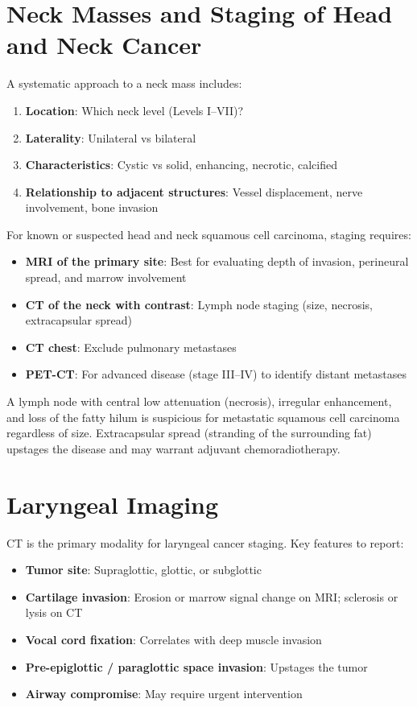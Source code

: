 \section{Neck Masses and Staging of Head and Neck Cancer}
A systematic approach to a neck mass includes:

\begin{enumerate}
  \item \textbf{Location}: Which neck level (Levels I--VII)?
  \item \textbf{Laterality}: Unilateral vs bilateral
  \item \textbf{Characteristics}: Cystic vs solid, enhancing, necrotic, calcified
  \item \textbf{Relationship to adjacent structures}: Vessel displacement, nerve involvement, bone invasion
\end{enumerate}

For known or suspected head and neck squamous cell carcinoma, staging requires:
\begin{itemize}
  \item \textbf{MRI of the primary site}: Best for evaluating depth of invasion, perineural spread, and marrow involvement
  \item \textbf{CT of the neck with contrast}: Lymph node staging (size, necrosis, extracapsular spread)
  \item \textbf{CT chest}: Exclude pulmonary metastases
  \item \textbf{PET-CT}: For advanced disease (stage III--IV) to identify distant metastases
\end{itemize}

\begin{pearlbox}
A lymph node with central low attenuation (necrosis), irregular enhancement, and loss of the fatty hilum is suspicious for metastatic squamous cell carcinoma regardless of size. Extracapsular spread (stranding of the surrounding fat) upstages the disease and may warrant adjuvant chemoradiotherapy.
\end{pearlbox}


\section{Laryngeal Imaging}
CT is the primary modality for laryngeal cancer staging. Key features to report:
\begin{itemize}
  \item \textbf{Tumor site}: Supraglottic, glottic, or subglottic
  \item \textbf{Cartilage invasion}: Erosion or marrow signal change on MRI; sclerosis or lysis on CT
  \item \textbf{Vocal cord fixation}: Correlates with deep muscle invasion
  \item \textbf{Pre-epiglottic / paraglottic space invasion}: Upstages the tumor
  \item \textbf{Airway compromise}: May require urgent intervention
\end{itemize}



